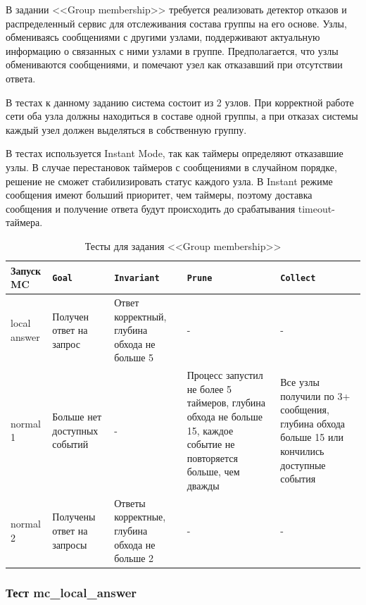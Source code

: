 \documentclass[a4paper,12pt]{extarticle}
\newcommand{\goal}[0]{\texttt{Goal}}
\newcommand{\prune}[0]{\texttt{Prune}}
\newcommand{\invariant}[0]{\texttt{Invariant}}
\newcommand{\collect}[0]{\texttt{Collect}}
\newcommand{\mc}[0]{MC}
\begin{document}
В задании <<Group membership>> \cite{b15} требуется реализовать детектор отказов и распределенный сервис для отслеживания состава группы на его основе.
Узлы, обмениваясь сообщениями с другими узлами, поддерживают актуальную информацию о связанных с ними узлами в группе.
Предполагается, что узлы обмениваются сообщениями, и помечают узел как отказавший при отсутствии ответа.

В тестах к данному заданию система состоит из 2 узлов.
При корректной работе сети оба узла должны находиться в составе одной группы, а при отказах системы каждый узел должен выделяться в собственную группу.

В тестах используется Instant Mode, так как таймеры определяют отказавшие узлы.
В случае перестановок таймеров с сообщениями в случайном порядке, решение не сможет стабилизировать статус каждого узла.
В Instant режиме сообщения имеют больший приоритет, чем таймеры, поэтому доставка сообщения и получение ответа будут происходить до срабатывания timeout-таймера.


\begin{table}[htbp]
    \caption{Тесты для задания <<Group membership>>}
    \begin{center}
    \begin{tabular}{|p{}|p{}|p{}|p{}|p{} |}
    \hline
    Запуск \mc & \goal & \invariant & \prune & \collect \\
    \hline
    local answer & Получен ответ на запрос & Ответ корректный, глубина обхода не больше 5 & - & - \\
    \hline
    normal 1  & Больше нет доступных событий & - & Процесс запустил не более 5 таймеров, глубина обхода не больше 15, каждое событие не повторяется больше, чем дважды & Все узлы получили по 3+ сообщения, глубина обхода больше 15 или кончились доступные события \\
    \hline
    normal 2 & Получены ответ на запросы & Ответы корректные, глубина обхода не больше 2 & - & - \\
    \hline
    \end{tabular}
    \label{testmembership}
    \end{center}
\end{table}

\subsubsection{Тест mc\_local\_answer}
\end{document}
